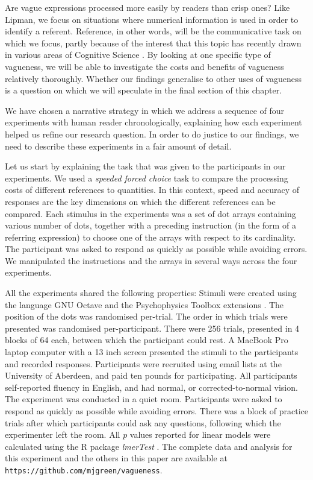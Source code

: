Are vague expressions processed more easily by readers than crisp ones? Like Lipman, we focus on situations where numerical information is used in order to identify a referent. Reference, in other words, will be the communicative task on which we focus, partly because of the interest that this topic has recently drawn in various areas of Cognitive Science \citep{vanDeemterCMR}. By looking at one specific type of vagueness, we will be able to investigate the costs and benefits of vagueness relatively thoroughly. Whether our findings generalise to other uses of vagueness is a question on which we will speculate in the final section of this chapter.

We have chosen a narrative strategy in which we address a sequence of four experiments with human reader chronologically, explaining how each experiment helped us refine our research question. In order to do justice to our findings, we need to describe these experiments in a fair amount of detail. 

Let us start by explaining the task that was given to the participants in our experiments. We used a {\em speeded forced choice} task to compare the processing costs of different references to quantities. In this context, speed and accuracy of responses are the key dimensions on which the different references can be compared. Each stimulus in the experiments was a set of dot arrays containing various number of dots, together with a preceding instruction (in the form of a referring expression) to choose one of the arrays with respect to its cardinality. The participant was asked to respond as quickly as possible while avoiding errors. We manipulated the instructions and the arrays in several ways across the four experiments. 

All the experiments shared the following properties: Stimuli were created using the language GNU Octave \citep{eaton:2002} and the Psychophysics Toolbox extensions \citep{ptbx1, ptbx2}. The position of the dots was randomised per-trial. The order in which trials were presented was randomised per-participant. There were 256 trials, presented in 4 blocks of 64 each, between which the participant could rest. A MacBook Pro laptop computer with a 13 inch screen presented the stimuli to the participants and recorded responses. Participants were recruited using email lists at the University of Aberdeen, and paid ten pounds for participating. All participants self-reported fluency in English, and had normal, or corrected-to-normal vision. The experiment was conducted in a quiet room. Participants were asked to respond as quickly as possible while avoiding errors. There was a block of practice trials after which participants could ask any questions, following which the experimenter left the room. All $p$ values reported for linear models were calculated using the R package \emph{lmerTest} \citep{lmerTest}. The complete data and analysis for this experiment and the others in this paper are available at \texttt{https://github.com/mjgreen/vagueness}.
 
